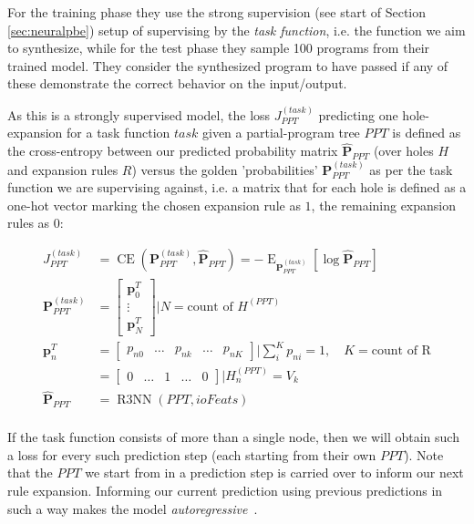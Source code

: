 \documentclass{article}
\begin{document}
For the training phase they use the strong supervision (see start of Section \ref{sec:neuralpbe})
setup of supervising by the \emph{task function},
i.e. the function we aim to synthesize,
while for the test phase they sample 100 programs from their trained model.
They consider the synthesized program to have passed if any of these demonstrate the correct behavior on the input/output.

As this is a strongly supervised model,
the loss $J^{(task)}_{PPT}$ predicting one hole-expansion for a task function $task$ given a
partial-program tree $PPT$ is defined as the cross-entropy between our predicted probability matrix
$\mathbf{\hat{P}}_{PPT}$ (over holes $H$ and expansion rules $R$)
versus the golden 'probabilities' $\mathbf{P}^{(task)}_{PPT}$ as per the task function we are supervising against,
i.e. a matrix that for each hole is defined as a one-hot vector marking the chosen expansion rule as $1$,
the remaining expansion rules as $0$:

\begin{align*}
J^{(task)}_{PPT} &= \operatorname{CE}(\mathbf{P}^{(task)}_{PPT},\mathbf{\hat{P}}_{PPT}) = -\operatorname{E}_{\mathbf{P}^{(task)}_{PPT}}[\log \mathbf{\hat{P}}_{PPT}] \\
\mathbf{P}^{(task)}_{PPT} &= \begin{bmatrix} \mathbf{p}^T_0 \\ \vdots \\ \mathbf{p}^T_N \end{bmatrix} | N = \text{count of } H^{(PPT)} \\
\mathbf{p}^T_n &= \begin{bmatrix} p_{n0} & \dots & p_{nk} & \dots & p_{nK} \end{bmatrix} | \sum^K_i p_{ni} = 1, \quad K = \text{count of R} \\
&= \begin{bmatrix} 0 & \dots & 1 & \dots & 0 \end{bmatrix} | H^{(PPT)}_n = V_k \\
\mathbf{\hat{P}}_{PPT} &= \operatorname{R3NN}(PPT, ioFeats) \\
\end{align*}

If the task function consists of more than a single node, then we will obtain such a loss for every such prediction step (each starting from their own $PPT$).
Note that the $PPT$ we start from in a prediction step is carried over to inform our next rule expansion.
Informing our current prediction using previous predictions in such a way makes the model \emph{autoregressive}~\citep{kendall1944autoregressive}.
\end{document}
